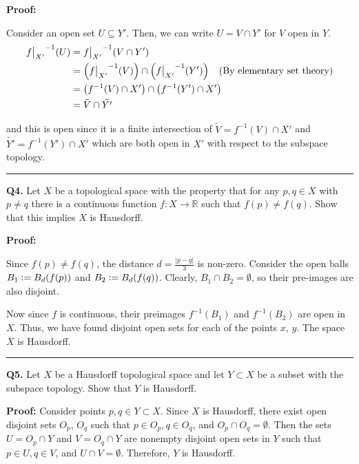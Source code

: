 \documentclass{article}
\newcommand{\defeq}{\vcentcolon=}
\newcommand{\restr}[2]{{%
  \left.\kern-\nulldelimiterspace %
  #1 %
  \vphantom{\big|} %
  \right|_{#2} %
  }}
\begin{document}
\vskip 0.5cm
\textbf{Proof:} 

Consider an open set $U \subseteq Y'$. Then, we can write $U = V \cap Y'$ for $V$ open in $Y$. 
\begin{align*}
  \restr{f}{X'}^{-1}(U) &= \restr{f}{X'}^{-1}(V \cap Y') \\
  &= \left( \restr{f}{X'}^{-1}(V) \right) \cap \left( \restr{f}{X'}^{-1}(Y') \right) \;\;\text{  (By elementary set theory)} \\
  &= \left(f^{-1}(V) \cap X'\right) \cap \left(f^{-1}(Y') \cap X'\right) \\
  &= \tilde{V} \cap \tilde{Y'}
\end{align*}


and this is open since it is a finite intersection of $\tilde{V} = f^{-1}(V) \cap X'$ and $\tilde{Y'} = f^{-1}(Y') \cap X'$ which are both open in $X'$ with respect to the subspace topology.

\vskip 0.5cm
\hrule 
\vskip 0.5cm

\textbf{Q4.} Let $X$ be a topological space with the property that for any $p, q \in X$ with $p \neq q$ there is a continuous function $f : X \rightarrow \mathbb{R}$ such that $f(p) \neq f(q)$. Show that this implies $X$ is Hausdorff.

\vskip 0.5cm
\textbf{Proof:} 

Since $f(p) \neq f(q)$, the distance $d = \frac{|p - q|}{3}$ is non-zero. Consider the open balls $B_1 \defeq B_d(f(p))$ and $B_2 \defeq B_d(f(q))$. Clearly, $B_1 \cap B_2 = \emptyset$, so their pre-images are also disjoint.

Now since $f$ is continuous, their preimages $f^{-1}(B_1)$ and $f^{-1}(B_2)$ are open in $X$. Thus, we have found disjoint open sets for each of the points $x$, $y$. The space $X$ is Hausdorff.
\vskip 0.5cm
\hrule 
\vskip 0.5cm

\textbf{Q5.} Let $X$ be a Hausdorff topological space and let $Y \subset X$ be a subset with the subspace topology. Show that $Y$ is Hausdorff.

\vskip 0.5cm
\textbf{Proof:} 
Consider points $p, q \in Y \subset X$. Since $X$ is Hausdorff, there exist open disjoint sets $O_p$, $O_q$ such that $p \in O_p, q \in O_q$, and $O_p \cap O_q = \emptyset$. Then the sets $U = O_p \cap Y$ and $V = O_q \cap Y$ are nonempty disjoint open sets in $Y$ such that $p \in U, q \in V$, and $U \cap V = \emptyset$. Therefore, $Y$ is Hausdorff.
\end{document}
